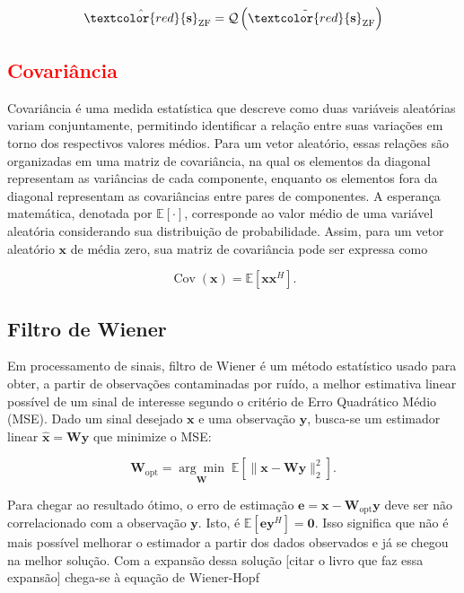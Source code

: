 \begin{equation}
\hat{\textcolor{red}{\mathbf{s}}}_\text{ZF}=
\mathcal{Q}\left(\tilde{\textcolor{red}{\mathbf{s}}}_\text{ZF}\right)
\label{eq:zf_detection}
\end{equation}


\subsection{\texorpdfstring{\textcolor{red}{Covariância}}{Covariância}}

Covariância é uma medida estatística que descreve como duas variáveis aleatórias variam conjuntamente, permitindo identificar a relação entre suas variações em torno dos respectivos valores médios. Para um vetor aleatório, essas relações são organizadas em uma matriz de covariância, na qual os elementos da diagonal representam as variâncias de cada componente, enquanto os elementos fora da diagonal representam as covariâncias entre pares de componentes. A esperança matemática, denotada por $\mathbb{E}[\cdot]$, corresponde ao valor médio de uma variável aleatória considerando sua distribuição de probabilidade. Assim, para um vetor aleatório $\mathbf{x}$ de média zero, sua matriz de covariância pode ser expressa como


\begin{equation}
\operatorname{Cov}(\mathbf{x})=\mathbb{E}[\mathbf{x}\mathbf{x}^H].
\label{eq:cov_definition}
\end{equation}


\subsection{Filtro de Wiener}

Em processamento de sinais, filtro de Wiener é um método estatístico usado para obter, a partir de observações contaminadas por ruído, a melhor estimativa linear possível de um sinal de interesse segundo o critério de Erro Quadrático Médio (MSE). Dado um sinal desejado $\mathbf{x}$ e uma observação $\mathbf{y}$, busca-se um estimador linear $\hat{\mathbf{x}}=\mathbf{W}\mathbf{y}$ que minimize o MSE:

\begin{equation}
\mathbf{W}_{\text{opt}} = \underset{\mathbf{W}}{\arg\min}\;
\mathbb{E}\left[\|\mathbf{x}-\mathbf{W}\mathbf{y}\|_2^2\right].
\label{eq:wiener_opt}
\end{equation}

Para chegar ao resultado ótimo, o erro de estimação $\mathbf{e}=\mathbf{x}-\mathbf{W}_{\text{opt}}\mathbf{y}$ deve ser não correlacionado com a observação $\mathbf{y}$. Isto, é $\mathbb{E}[\mathbf{e}\mathbf{y}^H]=\mathbf{0}$. Isso significa que não é mais possível melhorar o estimador a partir dos dados observados e já se chegou na melhor solução. Com a expansão dessa solução [citar o livro que faz essa expansão] chega-se à equação de Wiener-Hopf



